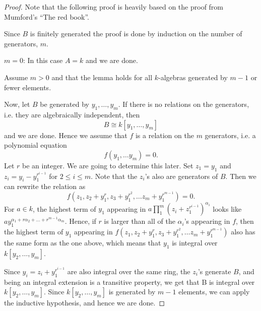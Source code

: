 \begin{proof}
Note that the following proof is heavily based on the proof from Mumford's ``The red book''. 

Since $B$ is finitely generated the proof is done by induction on the number of generators, $m$. 

$m=0$: 
In this case $A=k$ and we are done. 

Assume $m>0$ and that the lemma holds for all $k$-algebras generated by $m-1$ or fewer elements.

Now, let $B$ be generated by $y_1, \ldots, y_{m}$. 
If there is no relations on the generators, 
i.e. they are algebraically independent, then
\begin{equation*}
    B \cong k[y_1, \ldots, y_{m}]
\end{equation*}
and we are done. 
Hence we assume that $f$ is a relation on the $m$ generators, 
i.e. a polynomial equation
\begin{equation*}
    f(y_1, \ldots y_m) = 0. 
\end{equation*}
Let $r$ be an integer. 
We are going to determine this later. 
Set $z_1 = y_1$ and $z_i = y_i - y_1^{r^{i-1}}$ for $2\leq i \leq m$.
Note that the $z_i$'s also are generators of $B$.
Then we can rewrite the relation as
\begin{equation*}
    f(z_1, z_2+y_1^r, z_3+y_1^{r^2}, \ldots z_m+y_1^{r^{m-1}}) = 0.
\end{equation*}
For $a\in k$, 
the highest term of $y_1$ appearing in $a\prod_1^m (z_i + z_1^{r^{i-1}})^{\alpha_i}$ looks like $ay_1^{\alpha_1+r\alpha_2+\ldots+r^{m-1}\alpha_m}$. 
Hence, if $r$ is larger than all of the $\alpha_i$'s appearing in $f$, 
then the highest term of $y_1$ appearing in $f(z_1, z_2+y_1^r, z_3+y_1^{r^2}, \ldots z_m+y_1^{r^{m-1}})$ also has the same form as the one above, 
which means that $y_1$ is integral over $k[y_2, \ldots, y_m]$. 

Since $y_{i}=z_{i}+y_{1}^{r^{i-1}}$ are also integral over the same ring, 
the $z_i$'s generate $B$, and being an integral extension is a transitive property, 
we get that B is integral over $k[y_2, \ldots, y_m]$. 
Since $k[y_2, \ldots, y_m]$ is generated by $m-1$ elements, 
we can apply the inductive hypothesis, and hence we are done.
\end{proof}


